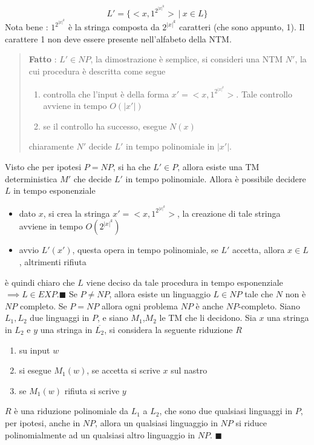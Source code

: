 \documentclass[10pt, letterpaper]{report}
\begin{document}
$$L'=\{<x,1^{2^{|x|^k}}> \ | \ x\in L \} $$
Nota bene : $1^{2^{|x|^k}}$ è la stringa composta da ${2^{|x|^k}}$ caratteri (che sono appunto, 1). Il carattere 1 non deve essere presente nell'alfabeto della NTM.
\begin{quote}
    \textbf{Fatto} : $L'\in NP$, la dimostrazione è semplice, si consideri una NTM $N'$, la cui procedura è descritta come segue\begin{enumerate}
        \item controlla che l'input è della forma $x'=<x,1^{2^{|x|^k}}>$. Tale controllo avviene in tempo $O(|x'|)$ 
        \item se il controllo ha successo, esegue $N(x)$
    \end{enumerate}
    chiaramente $N'$ decide $L'$ in tempo polinomiale in $|x'|$.
\end{quote}
Visto che per ipotesi $P=NP$, si ha che $L'\in P$, allora esiste una TM deterministica $M'$ che decide $L'$ in tempo polinomiale. Allora è possibile decidere $L$ in tempo esponenziale\begin{itemize}
    \item dato $x$, si crea la stringa $x'=<x,1^{2^{|x|^k}}>$, la creazione di tale stringa avviene in tempo $O(2^{|x|^k})$ 
    \item avvio $L'(x')$, questa opera in tempo polinomiale, se $L'$ accetta, allora $x\in L$, altrimenti rifiuta 
\end{itemize}
è quindi chiaro che $L$ viene deciso da tale procedura in tempo esponenziale $\implies L\in EXP$.\hfill$\blacksquare$\acc   
{} Se $P\ne NP$, allora esiste un linguaggio $L\in NP$ tale che $N$ non è $NP$ completo.\acc 
\teo{} Se $P=NP$ allora ogni problema $NP$ è anche $NP$-completo.\acc
\dimo{} Siano $L_1,L_2$ due linguaggi in $P$, e siano $M_1$,$M_2$ le TM che li decidono. Sia $x$ una stringa in $L_2$ e $y$ una stringa in $\overline{L_2}$, si considera la seguente riduzione $R$\begin{enumerate}
    \item su input $w$
    \item si esegue $M_1(w)$, se accetta si scrive $x$ sul nastro 
    \item se $M_1(w)$ rifiuta si scrive $y$
\end{enumerate}
$R$ è una riduzione polinomiale da $L_1$ a $L_2$, che sono due qualsiasi linguaggi in $P$, per ipotesi, anche in $NP$, allora un qualsiasi linguaggio in $NP$ si riduce polinomialmente ad un qualsiasi altro linguaggio in $NP$.
\hfill$\blacksquare$
\flowerLine
\end{document}
